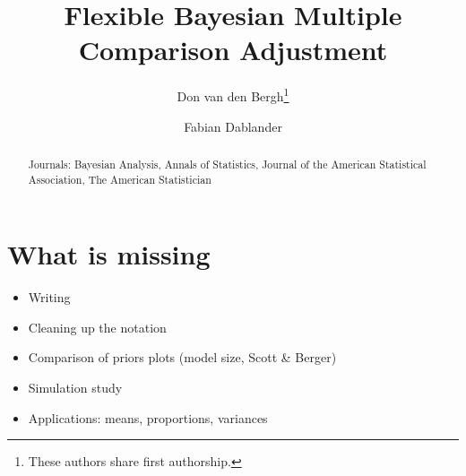 \documentclass[11pt,a4paper]{article}
\date{}
\title{Flexible Bayesian Multiple Comparison Adjustment}
\author{Don van den Bergh\thanks{These authors share first authorship.} }
\author{Fabian Dablander\samethanks[1]}
\affil{Department of Psychological Methods, University of Amsterdam}
\theoremstyle{definition} %
\theoremstyle{case}
\begin{document}
\maketitle

\begin{abstract}
\noindent Journals: Bayesian Analysis, Annals of Statistics, Journal of the American Statistical Association, The American Statistician
\end{abstract}

\section*{What is missing}
\begin{itemize}
    \item Writing
    \item Cleaning up the notation
    \item Comparison of priors plots (model size, Scott \& Berger)
    \item Simulation study
    \item Applications: means, proportions, variances
\end{itemize}

\tableofcontents


\iffalse
\end{document}
